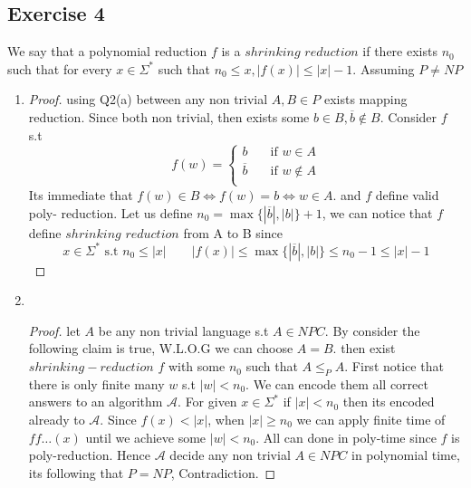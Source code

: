 \documentclass[12pt]{article}
\begin{document}
\subsection{Exercise 4} 
We say that a polynomial reduction $f$ is a $shrinking$ $reduction$ if there exists
$n_0$ such that for every $x\in \Sigma^*$
such that $n_0\le x , |f(x)|\le|x|-1$. Assuming $P\ne NP$
\begin{enumerate}[label=(\alph*)]
\item {}
\begin{proof}
using Q2(a) between any non trivial $A,B\in P$ exists mapping reduction. Since both non trivial, then exists some $b \in B,\overline{b}\notin B$. Consider $f$ s.t 
\[
f(w)=\begin{cases} 
      b &\quad\text{if  } w \in A \\
        \overline{b} &\quad\text{if  } w \notin A \\ \end{cases}  
     \]
     Its immediate that $f(w)\in B \Leftrightarrow f(w)=b \Leftrightarrow w\in A  $. and $f$ define valid poly- reduction. Let us define $n_0=\max \{|\overline{b}|,|b|\} +1$, we can notice that $f$ define $shrinking$ 
$reduction$ from A to B since
\[
x\in \Sigma^* \text{ s.t }n_0\le |x| \qquad |f(x)|\le \max \{|\overline{b}|,|b|\}\le n_0-1 \le |x|-1
\]
\end{proof}
\item {}
\\
\begin{proof}
let $A$ be any non trivial language s.t $A\in NPC$. By consider the following claim is true, W.L.O.G we can choose $A=B$. then exist  $shrinking 
-reduction$ $f$ with some $n_0$ such that $A\le_P A$. First notice that there is only finite many $w$ s.t $|w|< n_0$. We can encode them all correct answers   to an  algorithm $\mathcal{A}$.  For given $x\in \Sigma ^*$ if $|x|< n_0$ then its encoded already to $\mathcal{A}$. Since $f(x)<|x|$, when $|x|\ge  n_0$ we can apply finite time of $ff\dots (x)$  until we achieve  some $|w|<n_0$. All can done in poly-time since $f$ is poly-reduction. Hence $\mathcal{A}$ decide any non trivial $A\in NPC$ in polynomial time, its following that $P=NP$, Contradiction. 
 \end{proof}
\end{enumerate}
\end{document}
